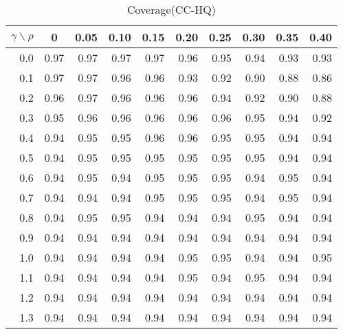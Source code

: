 \documentclass[12pt]{article}
\begin{document}
%
\begin{table}[!tbp]
\caption{Coverage(CC-HQ)}
 \begin{center}
 \begin{tabular}{r|rrrrrrrrr}\hline\hline
\multicolumn{1}{c|}{$\gamma\backslash\rho$}&\multicolumn{1}{c}{0}&\multicolumn{1}{c}{0.05}&\multicolumn{1}{c}{0.10}&\multicolumn{1}{c}{0.15}&\multicolumn{1}{c}{0.20}&\multicolumn{1}{c}{0.25}&\multicolumn{1}{c}{0.30}&\multicolumn{1}{c}{0.35}&\multicolumn{1}{c}{0.40}\tabularnewline
\hline

0.0&0.97&0.97&0.97&0.97&0.96&0.95&0.94&0.93&0.93\tabularnewline
0.1&0.97&0.97&0.96&0.96&0.93&0.92&0.90&0.88&0.86\tabularnewline
0.2&0.96&0.97&0.96&0.96&0.96&0.94&0.92&0.90&0.88\tabularnewline
0.3&0.95&0.96&0.96&0.96&0.96&0.96&0.95&0.94&0.92\tabularnewline
0.4&0.94&0.95&0.95&0.96&0.96&0.95&0.95&0.94&0.94\tabularnewline
0.5&0.94&0.95&0.95&0.95&0.95&0.95&0.95&0.94&0.94\tabularnewline
0.6&0.94&0.95&0.94&0.95&0.95&0.95&0.94&0.95&0.94\tabularnewline
0.7&0.94&0.94&0.94&0.95&0.95&0.95&0.94&0.95&0.94\tabularnewline
0.8&0.94&0.95&0.95&0.94&0.94&0.94&0.95&0.94&0.94\tabularnewline
0.9&0.94&0.94&0.94&0.94&0.94&0.94&0.94&0.94&0.94\tabularnewline
1.0&0.94&0.94&0.94&0.94&0.95&0.95&0.94&0.94&0.95\tabularnewline
1.1&0.94&0.94&0.94&0.94&0.95&0.94&0.95&0.94&0.94\tabularnewline
1.2&0.94&0.94&0.94&0.94&0.94&0.94&0.94&0.94&0.94\tabularnewline
1.3&0.94&0.94&0.94&0.94&0.94&0.94&0.94&0.94&0.94\tabularnewline
\hline
\end{tabular}

\end{center}

\end{table}
\end{document}
